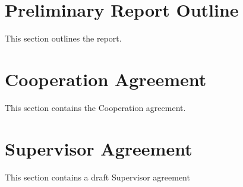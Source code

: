 \documentclass[11pt]{article}
\begin{document}
\section{Preliminary Report Outline}
This section outlines the report.
\label{sec:out}



\section{Cooperation Agreement}
This section contains the Cooperation agreement.
\label{sec:coop}


\section{Supervisor Agreement}
This section contains a draft Supervisor agreement
\label{sec:super}


\label{sec:lof}
\listoffigures
\end{document}
